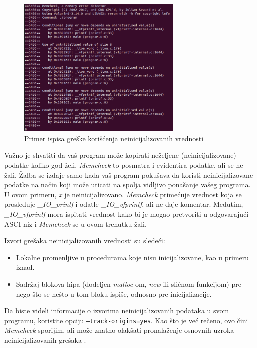 \documentclass[12pt,oneside]{memoir}
\theoremstyle{plain}
\theoremstyle{definition}
\begin{document}
\begin{figure}[!ht]
  \centering
  \includegraphics[width=0.7\textwidth]{uninitialisedError.png}
  \caption{Primer ispisa greške korišćenja neinicijalizovanih vrednosti}
  \label{fig:slika2.5}
\end{figure}

Važno je shvatiti da vaš program može kopirati neželjene (neinicijalizovane) podatke koliko god želi. \textit{Memcheck} to posmatra i evidentira podatke, ali se ne žali. Žalba se izdaje samo kada vaš program pokušava da koristi neinicijalizovane podatke na način koji može uticati na spolja vidljivo ponašanje vašeg programa. U ovom primeru, \textit{x} je neinicijalizovano. \textit{Memcheck} primećuje vrednost koja se prosleđuje \textit{\_IO\_printf} i odatle \textit{\_IO\_vfprintf}, ali ne daje komentar. Međutim, \textit{\_IO\_vfprintf} mora ispitati vrednost  kako bi je mogao pretvoriti u odgovarajući ASCI niz i \textit{Memcheck} se u ovom trenutku žali.

Izvori grešaka neinicijalizovanih vrednosti su sledeći:
\begin{itemize}
\item Lokalne promenljive u procedurama koje nisu inicijalizovane, kao u primeru iznad.
\item Sadržaj blokova hipa (dodeljen \textit{malloc}-om, \textit{new} ili sličnom funkcijom) pre nego što se nešto u tom bloku ispiše, odnosno pre inicijalizacije.
\end{itemize}

Da biste videli informacije o izvorima neinicijalizovanih podataka u svom programu, koristite opciju \texttt{--track-origins=yes}. Kao što je već rečeno, ovo čini \textit{Memcheck} sporijim, ali može znatno olakšati pronalaženje osnovnih uzroka neinicijalizovanih grešaka \cite{Memcheck}. 
\end{document}

